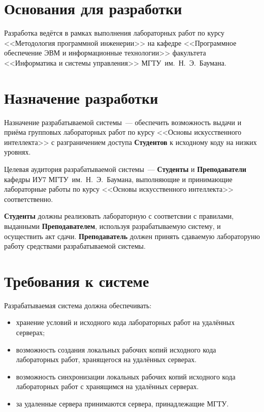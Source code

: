 \documentclass{bmstu}
\begin{document}
  \section{Основания для разработки}

  Разработка ведётся в рамках выполнения лабораторных работ по курсу
  <<Методология программной инженерии>> на кафедре <<Программное
  обеспечение ЭВМ и информационные технологии>> факультета
  <<Информатика и системы управления>> МГТУ~им.~Н.~Э.~Баумана.

  \section{Назначение разработки}

  Назначение разрабатываемой системы~--- обеспечить возможность выдачи и приёма
  групповых лабораторных работ по курсу <<Основы искусственного интеллекта>> с
  разграничением доступа \textbf{Студентов} к исходному коду на низких уровнях.

  Целевая аудитория разрабатываемой системы~--- \textbf{Студенты} и
  \textbf{Преподаватели} кафедры ИУ7 МГТУ~им.~Н.~Э.~Баумана, выполняющие и
  принимающие лабораторные работы по курсу <<Основы искусственного интеллекта>>
  соответственно.

  \textbf{Студенты} должны реализовать лабораторную с соответсвии с правилами,
  выданными \textbf{Преподавателем}, используя разрабатываемую систему, и
  осуществить акт сдачи.
  \textbf{Преподаватель} должен принять сдаваемую лабораторуню работу
  средствами разрабатываемой системы. 

  \section{Требования к системе}

  Разрабатываемая система должна обеспечивать:
  \begin{itemize}[label=---]
    \item хранение условий и исходного кода лабораторных работ на
      удалённых серверах;
    \item возможность создания локальных рабочих копий исходного кода
      лабораторных работ, хранящегося на удалённых серверах.
    \item возможность синхронизации локальных рабочих копий исходного
      кода лабораторных работ с хранящимся на удалённых серверах.
    \item за удаленные сервера принимаются сервера, принадлежащие МГТУ. 
  \end{itemize}
\end{document}
